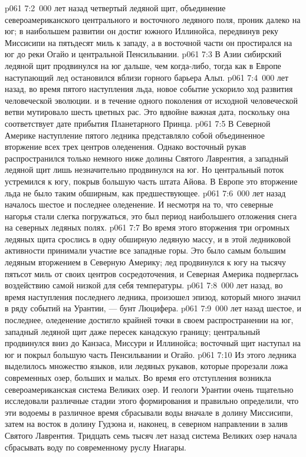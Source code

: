 \vs p061 7:2 \,000 лет назад четвертый ледяной щит, объединение североамериканского центрального и восточного ледяного поля, проник далеко на юг; в наибольшем развитии он достиг южного Иллинойса, передвинув реку Миссисипи на пятьдесят миль к западу, а в восточной части он простирался на юг до реки Огайо и центральной Пенсильвании.
\vs p061 7:3 В Азии сибирский ледяной щит продвинулся на юг дальше, чем когда\hyp{}либо, тогда как в Европе наступающий лед остановился вблизи горного барьера Альп.
\vs p061 7:4 \,000 лет назад, во время пятого наступления льда, новое событие ускорило ход развития человеческой эволюции.  и в течение одного поколения от исходной человеческой ветви мутировало шесть цветных рас. Это вдвойне важная дата, поскольку она соответствует дате прибытия Планетарного Принца.
\vs p061 7:5 В Северной Америке наступление пятого ледника представляло собой объединенное вторжение всех трех центров оледенения. Однако восточный рукав распространился только немного ниже долины Святого Лаврентия, а западный ледяной щит лишь незначительно продвинулся на юг. Но центральный поток устремился к югу, покрыв большую часть штата Айова. В Европе это вторжение льда не было таким обширным, как предшествующее.
\vs p061 7:6 \,000 лет назад началось шестое и последнее оледенение. И несмотря на то, что северные нагорья стали слегка погружаться, это был период наибольшего отложения снега на северных ледяных полях.
\vs p061 7:7 Во время этого вторжения три огромных ледяных щита срослись в одну обширную ледяную массу, и в этой ледниковой активности принимали участие все западные горы. Это было самым большим ледяным вторжением в Северную Америку; лед продвинулся к югу на тысячу пятьсот миль от своих центров сосредоточения, и Северная Америка подверглась воздействию самой низкой для себя температуры.
\vs p061 7:8 \,000 лет назад, во время наступления последнего ледника, произошел эпизод, который много значил в ряду событий на Урантии, --- бунт Люцифера.
\vs p061 7:9 \,000 лет назад шестое, и последнее, оледенение достигло крайней точки в своем распространении на юг, западный ледяной щит даже пересек канадскую границу; центральный продвинулся вниз до Канзаса, Миссури и Иллинойса; восточный щит наступал на юг и покрыл большую часть Пенсильвании и Огайо.
\vs p061 7:10 Из этого ледника выделилось множество языков, или ледяных рукавов, которые прорезали ложа современных озер, больших и малых. Во время его отступления возникла североамериканская система Великих озер. И геологи Урантии очень тщательно исследовали различные стадии этого формирования и правильно определили, что эти водоемы в различное время сбрасывали воды вначале в долину Миссисипи, затем на восток в долину Гудзона и, наконец, в северном направлении в залив Святого Лаврентия. Тридцать семь тысяч лет назад система Великих озер начала сбрасывать воду по современному руслу Ниагары.
